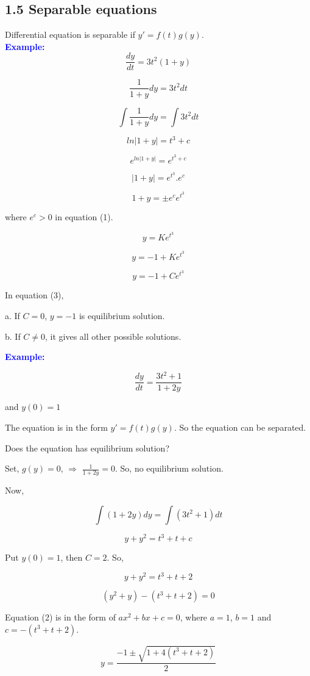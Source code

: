 \documentclass[
  11pt,
]{article}
\begin{document}
\subsection{1.5 Separable equations}\label{separable-equations}

Differential equation is separable if \(y'=f(t)g(y)\).\\

\textbf{\textcolor{blue}{Example:}} \[\frac{dy}{dt} = 3t^2(1+y)\]

\[
\frac{1}{1+y}dy = 3t^2dt \tag{1}
\]

\[
\int\frac{1}{1+y}dy = \int3t^2dt
\]

\[
ln|{1+y}|=t^3 + c
\]

\[
e^{ln|1+y|}=e^{t^3+c}
\]

\[
|1+y|=e^{t^3}.e^c 
\]

\[
1+y = \pm e^ce^{t^3} \tag{2}
\]

where \(e^c>0\) in equation (1).

\[
y = Ke^{t^3}
\]

\[
y = -1 + Ke^{t^3}
\]

\[
y = -1 + Ce^{t^3} \tag{3}
\]

In equation (3),

a. If \(C = 0\), \(y=-1\) is equilibrium solution.

b. If \(C \neq 0\), it gives all other possible solutions.

\textbf{\textcolor{blue}{Example:}}

\[
\frac{dy}{dt}=\frac{3t^2+1}{1+2y}
\]

and \(y(0) = 1\)

The equation is in the form \(y'=f(t)g(y)\). So the equation can be
separated.

Does the equation has equilibrium solution?

Set, \(g(y) = 0\), \(\Longrightarrow\) \(\frac{1}{1+2y} = 0\). So, no
equilibrium solution.

Now,

\[
\int(1+2y)dy=\int(3t^2+1)dt
\]

\[
y+y^2=t^3+t+c \tag{1}
\]

Put \(y(0) = 1\), then \(C = 2\). So,

\[
y+y^2=t^3+t+2
\]

\[
(y^2+y)-(t^3+t+2)=0 \tag{2}
\]

Equation (2) is in the form of \(ax^2+bx+c = 0\), where \(a = 1\),
\(b = 1\) and \(c = -(t^3+t+2)\).

\[
y = \frac{-1\pm\sqrt{1+4(t^3+t+2)}}{2}
\]
\end{document}
